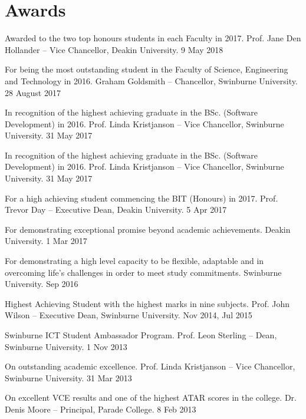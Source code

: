 \section{Awards}

{Awarded to the two top honours students in each Faculty in 2017.}
{Prof. Jane Den Hollander -- Vice Chancellor, Deakin University.}
{9 May 2018}

{For being the most outstanding student in the Faculty of Science, Engineering and Technology in 2016.}
{Graham Goldsmith -- Chancellor, Swinburne University.}
{28 August 2017}

{In recognition of the highest achieving graduate in the BSc. (Software Development) in 2016.}
{Prof. Linda Kristjanson -- Vice Chancellor, Swinburne University.}
{31 May 2017}

{In recognition of the highest achieving graduate in the BSc. (Software Development) in 2016.}
{Prof. Linda Kristjanson -- Vice Chancellor, Swinburne University.}
{31 May 2017}

\clearpage

{For a high achieving student commencing the BIT (Honours) in 2017.}
{Prof. Trevor Day -- Executive Dean, Deakin University.}
{5 Apr 2017}

{For demonstrating exceptional promise beyond academic achievements.}
{Deakin University.}
{1 Mar 2017}


{For demonstrating a high level capacity to be flexible, adaptable and in overcoming life's challenges in order to meet study commitments.}
{Swinburne University.}
{Sep 2016}

{Highest Achieving Student with the highest marks in nine subjects.}
{Prof. John Wilson -- Executive Dean, Swinburne University.}
{Nov 2014, Jul 2015}

{Swinburne ICT Student Ambassador Program.}
{Prof. Leon Sterling -- Dean, Swinburne University.}
{1 Nov 2013}

{On outstanding academic excellence.}
{Prof. Linda Kristjanson -- Vice Chancellor, Swinburne University.}
{31 Mar 2013}

{On excellent VCE results and one of the highest ATAR scores in the college.}
{Dr. Denis Moore -- Principal, Parade College.}
{8 Feb 2013}
